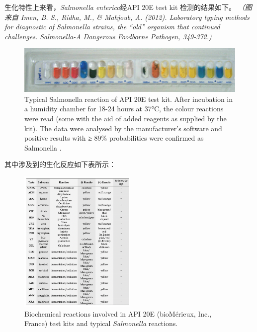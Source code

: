\documentclass[cn,black,12pt,normal]{elegantnote}
\begin{document}
生化特性上来看，\textit{Salmonella enterica}经API 20E test kit 检测的结果如下。\cite{imen2012laboratory}
\textit{（图来自 Imen, B. S., Ridha, M., \& Mahjoub, A. (2012). Laboratory typing methods for diagnostic of Salmonella strains, the “old” organism that continued challenges. Salmonella-A Dangerous Foodborne Pathogen, 349-372.)}
\begin{figure}[H]
    \centering
    \includegraphics[width=1\textwidth]{image/Typical-Salmonella-reaction-of-API-20E-test-kit-After-incubation-in-a-humidity-chamber.png}
    \caption{Typical Salmonella reaction of API 20E test kit. After incubation in a humidity chamber for 18-24 hours at 37°C, the colour reactions were read (some with the aid of added reagents as supplied by the kit). The data were analysed by the manufacturer’s software and positive results with ≥ 89\% probabilities were confirmed as Salmonella .}
    \label{F-01}
\end{figure}
其中涉及到的生化反应如下表所示：
\begin{figure}[H]
    \centering
    \includegraphics[width=0.5\textwidth]{image/Screen Shot 2021-05-10 at 10.48.35.png}
    \caption{ Biochemical reactions involved in API 20E (bioMérieux, Inc., France) test kits and typical \textit{Salmonella} reactions. }
    \label{F-02}
\end{figure}
\end{document}
